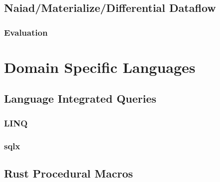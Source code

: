 \subsection{Naiad/Materialize/Differential Dataflow}
\subsubsection{Evaluation}
\section{Domain Specific Languages}
\subsection{Language Integrated Queries}
\subsubsection{LINQ}
\subsubsection{sqlx}

\subsection{Rust Procedural Macros}

